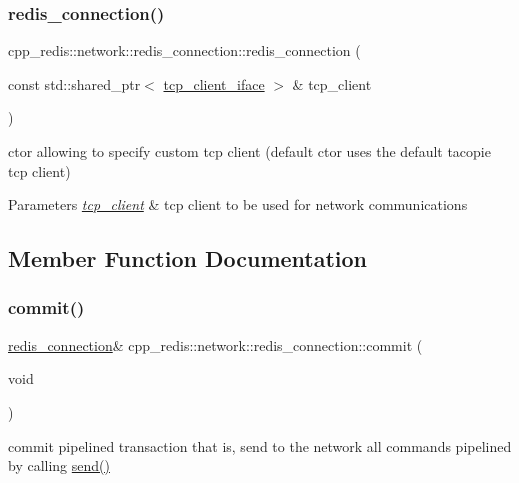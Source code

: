 \subsubsection{\texorpdfstring{redis\+\_\+connection()}{redis\_connection()}}
{\footnotesize\ttfamily cpp\+\_\+redis\+::network\+::redis\+\_\+connection\+::redis\+\_\+connection (\begin{DoxyParamCaption}\item[{const std\+::shared\+\_\+ptr$<$ \mbox{\hyperlink{classcpp__redis_1_1network_1_1tcp__client__iface}{tcp\+\_\+client\+\_\+iface}} $>$ \&}]{tcp\+\_\+client }\end{DoxyParamCaption})\hspace{0.3cm}{\ttfamily [explicit]}}

ctor allowing to specify custom tcp client (default ctor uses the default tacopie tcp client)


\begin{DoxyParams}{Parameters}
{\em \mbox{\hyperlink{classcpp__redis_1_1network_1_1tcp__client}{tcp\+\_\+client}}} & tcp client to be used for network communications \\
\hline
\end{DoxyParams}


\subsection{Member Function Documentation}
\mbox{\label{classcpp__redis_1_1network_1_1redis__connection_a8e6980d40139877c16e995051b780d60}} 
\subsubsection{\texorpdfstring{commit()}{commit()}}
{\footnotesize\ttfamily \mbox{\hyperlink{classcpp__redis_1_1network_1_1redis__connection}{redis\+\_\+connection}}\& cpp\+\_\+redis\+::network\+::redis\+\_\+connection\+::commit (\begin{DoxyParamCaption}\item[{void}]{ }\end{DoxyParamCaption})}

commit pipelined transaction that is, send to the network all commands pipelined by calling \mbox{\hyperlink{classcpp__redis_1_1network_1_1redis__connection_a98c163ce431e85e46e139211564b7b3f}{send()}}

